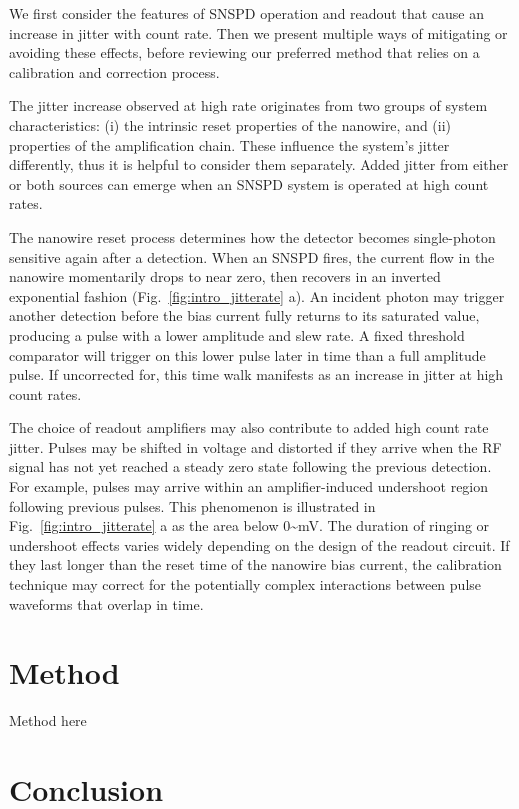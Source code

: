 \documentclass[11pt]{caltech_thesis} %
\begin{document}
We first consider the features of SNSPD operation and readout that cause
an increase in jitter with count rate. Then we present multiple ways of
mitigating or avoiding these effects, before reviewing our preferred
method that relies on a calibration and correction process.

The jitter increase observed at high rate originates from two groups of
system characteristics: (i) the intrinsic reset properties of the
nanowire, and (ii) properties of the amplification chain. These
influence the system's jitter differently, thus it is helpful to
consider them separately. Added jitter from either or both sources can
emerge when an SNSPD system is operated at high count rates.

The nanowire reset process determines how the detector becomes
single-photon sensitive again after a detection. When an SNSPD fires,
the current flow in the nanowire momentarily drops to near zero, then
recovers in an inverted exponential fashion
(Fig.~\ref{fig:intro_jitterate} a). An incident photon may trigger
another detection before the bias current fully returns to its saturated
value, producing a pulse with a lower amplitude and slew rate. A fixed
threshold comparator will trigger on this lower pulse later in time than
a full amplitude pulse. If uncorrected for, this time walk manifests as
an increase in jitter at high count rates.

The choice of readout amplifiers may also contribute to added high count
rate jitter. Pulses may be shifted in voltage and distorted if they
arrive when the RF signal has not yet reached a steady zero state
following the previous detection. For example, pulses may arrive within
an amplifier-induced undershoot region following previous pulses. This
phenomenon is illustrated in Fig.~\ref{fig:intro_jitterate} a as the
area below 0\textasciitilde mV. The duration of ringing or undershoot
effects varies widely depending on the design of the readout circuit. If
they last longer than the reset time of the nanowire bias current, the
calibration technique may correct for the potentially complex
interactions between pulse waveforms that overlap in time.

\hypertarget{method}{%
\section{Method}\label{method}}

Method here

\hypertarget{conclusion}{%
\section{Conclusion}\label{conclusion}}
\end{document}
